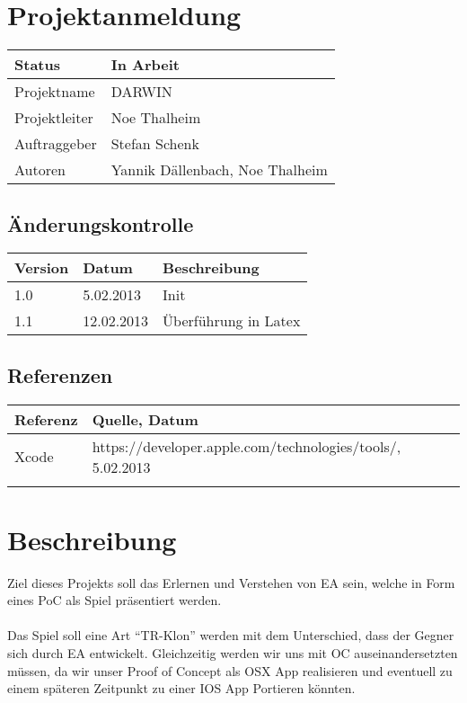 \documentclass{scrartcl}
\begin{document}
	\section*{Projektanmeldung}
	\begin{tabularx}{\textwidth}{| X | X |}
	\hline
	Status & In Arbeit\\
	\hline
	Projektname & DARWIN\\
	\hline
	Projektleiter & Noe Thalheim\\
	\hline
	Auftraggeber & Stefan Schenk\\
	\hline
	Autoren & Yannik Dällenbach, Noe Thalheim\\
	\hline
	\end{tabularx}
	
	\subsection*{Änderungskontrolle}
	\begin{tabularx}{\textwidth}{| X | X | X |}
	\hline
	\rowcolor[gray]{0.9} Version & Datum & Beschreibung\\
	\hline
	1.0 & 5.02.2013 & Init\\
	\hline
	1.1 & 12.02.2013 & Überführung in Latex\\
	\hline
	\end{tabularx}	
	
	\subsection*{Referenzen}
	
	\begin{tabular}{| l | l | }
	\hline
	\rowcolor[gray]{0.9} Referenz & Quelle, Datum\\
	\hline
	Xcode & https://developer.apple.com/technologies/tools/, 5.02.2013\\
	\hline
	 & \\
	\hline
	\end{tabular}
	
	\tableofcontents
	\pagebreak
	\section{Beschreibung}
	Ziel dieses Projekts soll das Erlernen und Verstehen von \Gls{EA} sein, welche in Form eines \Gls{PoC} als Spiel präsentiert werden.  
	\\\\
	Das Spiel soll eine Art “\Gls{TR}-Klon” werden mit dem Unterschied, dass der Gegner sich durch \Gls{EA} entwickelt. Gleichzeitig werden wir uns mit \Gls{OC} auseinandersetzten müssen, da wir unser Proof of Concept als \Gls{OSX} App realisieren und eventuell zu einem späteren Zeitpunkt zu einer \gls{IOS} App Portieren könnten.
\end{document}
